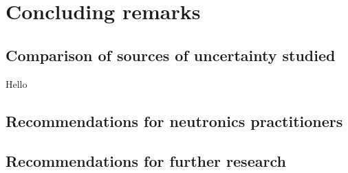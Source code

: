 
\chapter{Concluding remarks} %
\label{chap:conclusion}

\ifpdf
    \graphicspath{{Chapter4/Figs/Raster/}{Chapter4/Figs/PDF/}{Chapter4/Figs/}}
\else
    \graphicspath{{Chapter4/Figs/Vector/}{Chapter4/Figs/}}
\fi


\section{Comparison of sources of uncertainty studied}
Hello

\section{Recommendations for neutronics practitioners}

\section{Recommendations for further research}

